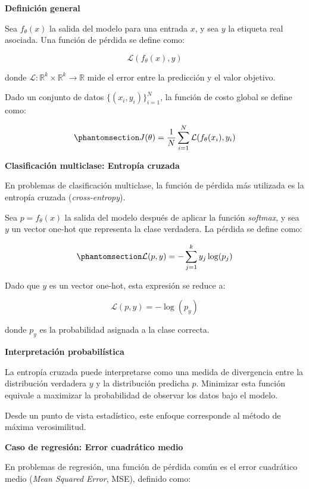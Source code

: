 \documentclass[
  spanish,
  us-letterpaper,
  DIV=11,
  numbers=noendperiod]{scrreprt}
\begin{document}
\textbf{Definición general}

Sea \(f_\theta(x)\) la salida del modelo para una entrada \(x\), y sea
\(y\) la etiqueta real asociada. Una función de pérdida se define como:

\[
\mathcal{L}(f_\theta(x), y)
\]

donde \(\mathcal{L} : \mathbb{R}^k \times \mathbb{R}^k \to \mathbb{R}\)
mide el error entre la predicción y el valor objetivo.

Dado un conjunto de datos \(\{(x_i, y_i)\}_{i=1}^{N}\), la función de
costo global se define como:

\begin{equation}\phantomsection\label{eq-risk}{
J(\theta) = \frac{1}{N} \sum_{i=1}^{N} \mathcal{L}(f_\theta(x_i), y_i)
}\end{equation}

\textbf{Clasificación multiclase: Entropía cruzada}

En problemas de clasificación multiclase, la función de pérdida más
utilizada es la entropía cruzada (\emph{cross-entropy}).

Sea \(p = f_\theta(x)\) la salida del modelo después de aplicar la
función \emph{softmax}, y sea \(y\) un vector one-hot que representa la
clase verdadera. La pérdida se define como:

\begin{equation}\phantomsection\label{eq-cross-entropy}{
\mathcal{L}(p, y) = - \sum_{j=1}^{k} y_j \log(p_j)
}\end{equation}

Dado que \(y\) es un vector one-hot, esta expresión se reduce a:

\[
\mathcal{L}(p, y) = -\log(p_{y})
\]

donde \(p_y\) es la probabilidad asignada a la clase correcta.

\textbf{Interpretación probabilística}

La entropía cruzada puede interpretarse como una medida de divergencia
entre la distribución verdadera \(y\) y la distribución predicha \(p\).
Minimizar esta función equivale a maximizar la probabilidad de observar
los datos bajo el modelo.

Desde un punto de vista estadístico, este enfoque corresponde al método
de máxima verosimilitud.

\textbf{Caso de regresión: Error cuadrático medio}

En problemas de regresión, una función de pérdida común es el error
cuadrático medio (\emph{Mean Squared Error}, MSE), definido como:
\end{document}
